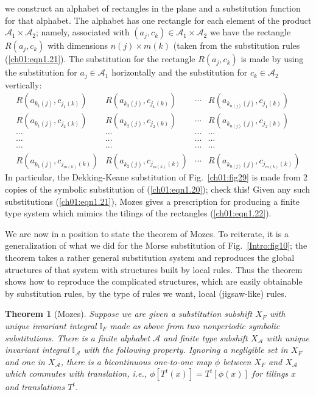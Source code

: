 \documentclass[reqno]{stml-l}
\theoremstyle{plain}
\newtheorem{theorem}{Theorem}[chapter]
\theoremstyle{definition}
\numberwithin{equation}{chapter}
\begin{document}
\noindent we construct an alphabet of rectangles in the
plane and a substitution function for that alphabet. The
alphabet has one rectangle for each element of the product
$\mathcal{A}_{1}\times \mathcal{A}_{2}$; namely, associated
with $(a_{j}, c_{k})\in \mathcal{A}_{1}\times
\mathcal{A}_{2}$ we have the rectangle $R(a_{j}, c_{k})$
with dimensions $n(j)\times m(k)$ (taken from the
substitution rules (\ref{ch01:eqn1.21}). The substitution
for the rectangle $R(a_{j}, c_{k})$ is made by using the
substitution for $a_{j}\in \mathcal{A}_{1}$ horizontally
and the substitution for $c_{k}\in \mathcal{A}_{2}$
vertically:
\begin{equation}\label{ch01:eqn1.22}
\begin{matrix}R(a_{k_{1}(j)},c_{j_{1}(k)})  & R(a_{k_{2}(j)}, c_{j_{1}(k)})
& \cdots & R(a_{k_{n(j)}(j)}, c_{j_{1}(k)})\\
R(a_{k_{1}(j)},c_{j_{2}(k)}) & R(a_{k_{2}(j)},c_{j_{2}(k)}) & \cdots & R(a_{k_{n(j)}(j)}, c_{j_{2}(k)})\\
\cdots & \cdots & \cdots & \cdots \\
\cdots & \cdots & \cdots & \cdots \\
\cdots & \cdots & \cdots & \cdots \\
R(a_{k_{1}(j)}, c_{j_{m(k)}(k)}) & R(a_{k_{2}(j)}, c_{j_{m(k)}(k)}) & \cdots
& R(a_{k_{n(j)}(j)}, c_{j_{m(k)}(k)})
\end{matrix}
\end{equation}
In particular, the Dekking-Keane substitution of Fig.~\ref{ch01:fig29} is made from 2 copies of the symbolic substitution of (\ref{ch01:eqn1.20}); check this! Given any such substitutions (\ref{ch01:eqn1.21}), Mozes gives a prescription for producing a finite type system which mimics the tilings of the rectangles (\ref{ch01:eqn1.22}).

We are now in a position to state the theorem of
Mozes. To reiterate, it is a
generalization of what we did for the Morse substitution of
Fig.~\ref{Intro:fig10}; the theorem takes a rather general
substitution system and reproduces the global structures of that
system with structures built by local rules. Thus the theorem shows
how to reproduce the complicated structures, which are easily
obtainable by substitution rules, by the type of rules we want,
local (jigsaw-like) rules.

\begin{theorem}[Mozes]\label{ch01:thm1.10}
Suppose we are given a substitution subshift $X_{F}$ with unique invariant integral $\mathbb{I}_{F}$ made as above from two nonperiodic symbolic substitutions. There is a finite alphabet $\mathcal{A}$ and finite type subshift $X_{\mathcal{A}}$ with unique invariant integral $\mathbb{I}_{\mathcal{A}}$ with the following property. Ignoring a negligible set in $X_{F}$ and one in $X_{\mathcal{A}}$, there is a bicontinuous one-to-one map $\phi$ between $X_{F}$ and $X_{\mathcal{A}}$ which commutes with translation, i.e., $\phi[T^{t}(x)]=T^{t}[\phi(x)]$ for tilings $x$ and translations $T^{t}$.
\end{theorem}
\end{document}
